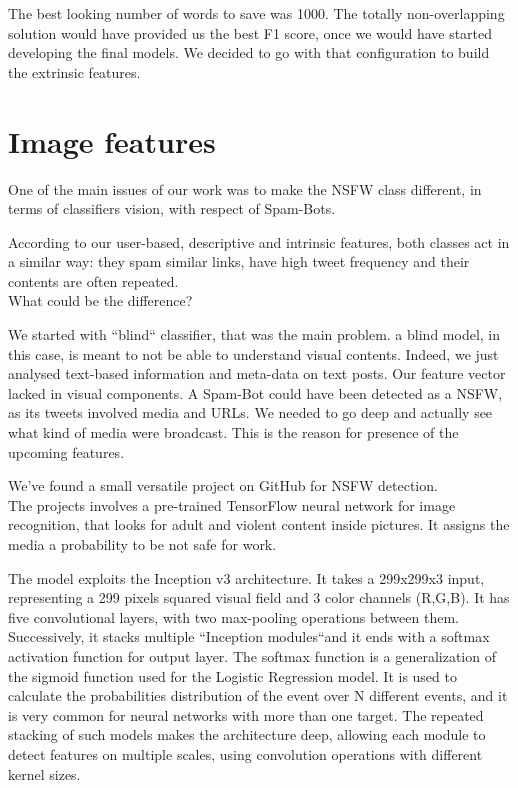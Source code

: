 The best looking number of words to save was 1000. The totally non-overlapping solution would have provided us the best F1 score, once we would have started developing the final models. We decided to go with that configuration to build the extrinsic features. 


\section{Image features}
One of the main issues of our work was to make the NSFW class different, in terms of classifiers vision, with respect of Spam-Bots.

According to our user-based, descriptive and intrinsic features, both classes act in a similar way: they spam similar links, have high tweet frequency and their contents are often repeated.\\
What could be the difference?

We started with ``blind`` classifier, that was the main problem. a blind model, in this case, is meant to not be able to understand visual contents. Indeed, we just analysed text-based information and meta-data on text posts. Our feature vector lacked in visual components. A Spam-Bot could have been detected as a NSFW, as its tweets involved media and URLs. We needed to go deep and actually see what kind of media were broadcast.
This is the reason for presence of the upcoming features.

We've found a small versatile project on GitHub for NSFW detection.\\
The projects involves a pre-trained TensorFlow neural network for image recognition, that looks for adult and violent content inside pictures. It assigns the media a probability to be not safe for work.

The model exploits the Inception v3 \cite{inception} architecture.
It takes a 299x299x3 input, representing a 299 pixels squared visual field and 3 color channels (R,G,B). It has five convolutional layers, with two max-pooling operations between them. Successively, it stacks multiple ``Inception modules``and it ends with a softmax activation function for output layer.
The softmax function is a generalization of the sigmoid function used for the Logistic Regression model. It is used to calculate the probabilities distribution of the event over N different events, and it is very common for neural networks with more than one target.
The repeated stacking of such models makes the architecture deep, allowing each module to detect features on multiple scales, using convolution operations with different kernel sizes.



